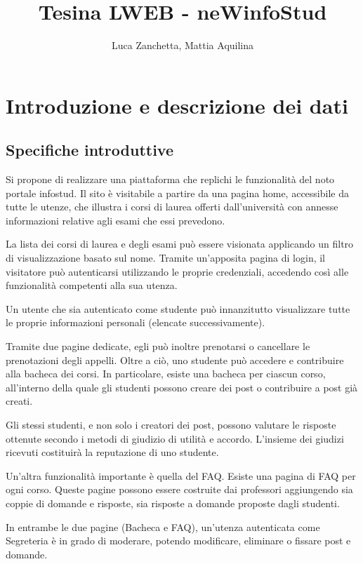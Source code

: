 \documentclass [a4paper,11pt]{book}
\begin{document}
\author{Luca Zanchetta, Mattia Aquilina}
\title{Tesina LWEB - neWinfoStud}
\maketitle
\tableofcontents

\chapter{Introduzione e descrizione dei dati}

\section{Specifiche introduttive}
\label{sec:specifiche}

Si propone di realizzare una piattaforma che replichi le funzionalità del noto portale infostud. Il sito è visitabile a partire da una pagina home, accessibile da tutte le utenze, che illustra i corsi di laurea offerti dall’università con annesse informazioni relative agli esami che essi prevedono.
  
La lista dei corsi di laurea e degli esami può essere visionata applicando un filtro di visualizzazione basato sul nome.
Tramite un’apposita pagina di login, il visitatore può autenticarsi utilizzando le proprie credenziali, accedendo così alle funzionalità competenti alla sua utenza.

Un utente che sia autenticato come studente può innanzitutto visualizzare tutte le proprie informazioni personali (elencate successivamente). 

Tramite due pagine dedicate, egli può inoltre prenotarsi o cancellare le prenotazioni degli appelli. Oltre a ciò, uno studente può accedere e contribuire alla bacheca dei corsi. In particolare, esiste una bacheca per ciascun corso, all’interno della quale gli studenti possono creare dei post o contribuire a post già creati. 

Gli stessi studenti, e non solo i creatori dei post, possono valutare le risposte ottenute secondo i metodi di giudizio di utilità e accordo. L’insieme dei giudizi ricevuti costituirà la reputazione di uno studente.

Un’altra funzionalità importante è quella del FAQ. Esiste una pagina di FAQ per ogni corso. Queste pagine possono essere costruite dai professori aggiungendo sia coppie di domande e risposte, sia risposte a domande proposte dagli studenti.

In entrambe le due pagine (Bacheca e FAQ), un’utenza autenticata come Segreteria è in grado di moderare, potendo modificare, eliminare o fissare post e domande.
\end{document}
